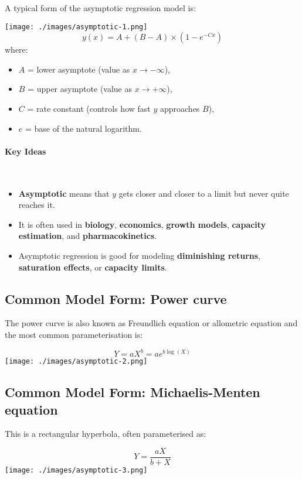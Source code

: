\documentclass{article}
\begin{document}
A typical form of the asymptotic regression model is:

\texttt{[image: ./images/asymptotic-1.png]}
\[
y(x) = A + (B - A) \times (1 - e^{-C x})
\]
where:
\begin{itemize}
    \item \( A \) = lower asymptote (value as \( x \to -\infty \)),
    \item \( B \) = upper asymptote (value as \( x \to +\infty \)),
    \item \( C \) = rate constant (controls how fast \( y \) approaches \( B \)),
    \item \( e \) = base of the natural logarithm.
\end{itemize}

\paragraph{Key Ideas}~\\
\begin{itemize}
    \item \textbf{Asymptotic} means that \( y \) gets closer and closer to a limit but never quite reaches it.
    \item It is often used in \textbf{biology}, \textbf{economics}, \textbf{growth models}, \textbf{capacity estimation}, and \textbf{pharmacokinetics}.
    \item Asymptotic regression is good for modeling \textbf{diminishing returns}, \textbf{saturation effects}, or \textbf{capacity limits}.
\end{itemize}

\subsection{Common Model Form: Power curve}
The power curve is also known as Freundlich equation or allometric equation and the most common parameterisation is:

$$
Y = a X^b = a e^{b \log(X)}
$$
\texttt{[image: ./images/asymptotic-2.png]}

\subsection{Common Model Form: Michaelis-Menten equation}
This is a rectangular hyperbola, often parameterised as:

$$
Y = \frac{a X}{b + X}
$$
\texttt{[image: ./images/asymptotic-3.png]}
\end{document}
